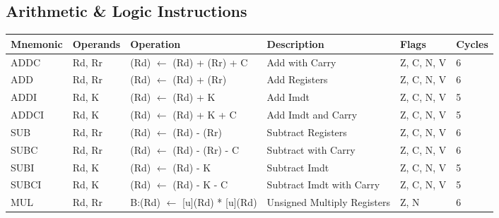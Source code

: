 \begin{footnotesize}
\renewcommand{\arraystretch}{1.385}
\doublespacing
\subsection{Arithmetic \& Logic Instructions}
\begin{tabular}{|p{14.5mm}|p{14mm}|p{47mm}|p{46.5mm}|p{14mm}|p{10mm}|}
    \rowcolor{gray!50}
    \hline
    Mnemonic & Operands  & Operation                                                              & Description                               & Flags & Cycles \\ \hline
    ADDC     & Rd, Rr    & (Rd) $\leftarrow$ (Rd) + (Rr) + C                                                 & Add with Carry                            & Z, C, N, V     & 6      \\
    ADD      & Rd, Rr    & (Rd) $\leftarrow$ (Rd) + (Rr)                                                     & Add Registers                            & Z, C, N, V     & 6      \\
    ADDI     & Rd, K     & (Rd) $\leftarrow$ (Rd) + K                                                        & Add Imdt                                  & Z, C, N, V     & 5      \\
    ADDCI    & Rd, K     & (Rd) $\leftarrow$ (Rd) + K + C                                                    & Add Imdt and Carry                        & Z, C, N, V     & 5      \\
    SUB      & Rd, Rr    & (Rd) $\leftarrow$ (Rd) - (Rr)                                                     & Subtract Registers                        & Z, C, N, V     & 6      \\
    SUBC     & Rd, Rr    & (Rd) $\leftarrow$ (Rd) - (Rr) - C                                                 & Subtract with Carry                       & Z, C, N, V     & 6      \\
    SUBI     & Rd, K     & (Rd) $\leftarrow$ (Rd) - K                                                        & Subtract Imdt                             & Z, C, N, V     & 5      \\
    SUBCI    & Rd, K     & (Rd) $\leftarrow$ (Rd) - K - C                                                    & Subtract Imdt with Carry                  & Z, C, N, V     & 5      \\
    MUL      & Rd, Rr    & B:(Rd) $\leftarrow$ {[}u{]}(Rd) * {[}u{]}(Rd)                                   & Unsigned Multiply Registers               & Z, N           & 6      \\

\end{tabular}
\end{footnotesize}
